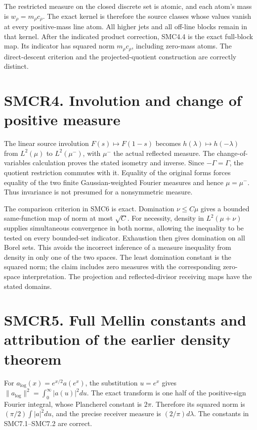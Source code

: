 The restricted measure on the closed discrete set is atomic, and each
atom's mass is \(w_\rho=m_\rho c_\rho\). The exact kernel is therefore
the source classes whose values vanish at every positive-mass line atom.
All higher jets and all off-line blocks remain in that kernel. After the
indicated product correction, SMC4.4 is the exact full-block map. Its
indicator has squared norm \(m_\rho c_\rho\), including zero-mass atoms.
The direct-descent criterion and the projected-quotient construction are
correctly distinct.

\section{SMCR4. Involution and change of positive
measure}\label{smcr4.-involution-and-change-of-positive-measure}

The linear source involution \(F(s)\mapsto F(1-s)\) becomes
\(h(\lambda)\mapsto h(-\lambda)\) from \(L^2(\mu)\) to \(L^2(\mu^-)\),
with \(\mu^-\) the actual reflected measure. The change-of-variables
calculation proves the stated isometry and inverse. Since
\(-\Gamma=\Gamma\), the quotient restriction commutes with it. Equality
of the original forms forces equality of the two finite
Gaussian-weighted Fourier measures and hence \(\mu=\mu^-\). Thus
invariance is not presumed for a nonsymmetric measure.

The comparison criterion in SMC6 is exact. Domination \(\nu\le C\mu\)
gives a bounded same-function map of norm at most \(\sqrt C\). For
necessity, density in \(L^2(\mu+\nu)\) supplies simultaneous convergence
in both norms, allowing the inequality to be tested on every bounded-set
indicator. Exhaustion then gives domination on all Borel sets. This
avoids the incorrect inference of a measure inequality from density in
only one of the two spaces. The least domination constant is the squared
norm; the claim includes zero measures with the corresponding zero-space
interpretation. The projection and reflected-divisor receiving maps have
the stated domains.

\section{SMCR5. Full Mellin constants and attribution of the earlier
density
theorem}\label{smcr5.-full-mellin-constants-and-attribution-of-the-earlier-density-theorem}

For \(a_{\log}(x)=e^{x/2}a(e^x)\), the substitution \(u=e^x\) gives
\(\|a_{\log}\|^2=\int_0^\infty|a(u)|^2du\). The exact transform is one
half of the positive-sign Fourier integral, whose Plancherel constant is
\(2\pi\). Therefore its squared norm is \((\pi/2)\int|a|^2du\), and the
precise receiver measure is \((2/\pi)d\lambda\). The constants in
SMC7.1--SMC7.2 are correct.

